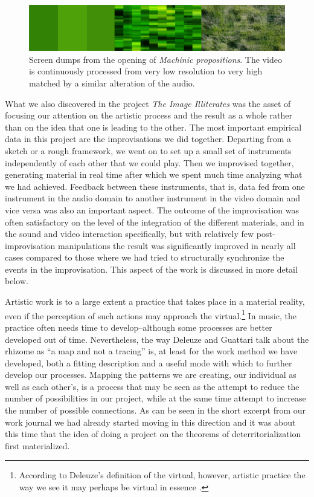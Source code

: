 \documentclass[11pt]{article}
\begin{document}
\begin{figure}
  \centering
  \includegraphics[width=\linewidth]{img/stills-compilation-beg.png}
  \caption{Screen dumps from the opening of \emph{Machinic propositions}. The video is continuously processed from very low resolution to very high matched by a similar alteration of the audio.}
  \label{fig:machinic-1}
\end{figure}

What we also discovered in the project \emph{The Image Illiterates}
was the asset of focusing our attention on the artistic process and the
result as a whole rather than on the idea that one is leading to the other. The most
important empirical data in this project are the improvisations
we did together. Departing from a sketch or a rough framework, we went on to
set up a small set of instruments independently of each other that we
could play. Then we improvised together, generating material in real
time after which we spent much time analyzing what we had achieved. Feedback
between these instruments, that is, data fed from one instrument in
the audio domain to another instrument in the video domain and vice
versa was also an important aspect. The outcome of the improvisation was often
satisfactory on the level of the integration of the different
materials, and in the sound and video interaction specifically, but
with relatively few post-improvisation manipulations the result was
significantly improved in nearly all cases
compared to those where we had tried to
structurally synchronize the events in the improvisation. This aspect
of the work is discussed in more detail below. 

Artistic work is to a large extent a practice that takes
place in a material reality, even if the perception of such actions may
approach the virtual.\footnote{According to Deleuze's definition of
  the virtual, however, artistic practice the way we see it may perhaps
  be virtual in essence \citep[See e.g.][]{deleuze88}.} In music, the
practice often needs time to develop--although some processes are
better developed out of time. Nevertheless, the way Deleuze and
Guattari talk about the rhizome as ``a map and not a tracing''
\citep[p. 13]{deleuze80} is, at least for the work method we have
developed, both a fitting description and a useful mode with which to further
develop our processes. Mapping the patterns we are creating, our
individual as well as each other's, is a process that may be
seen as the attempt to reduce the number of possibilities in our
project, while at the same time attempt to increase the number of
possible connections. As can be seen in the short excerpt from our
work journal we had already started moving in this direction and it
was about this time that the idea of doing a project on the theorems
of deterritorialization first materialized. 
\end{document}
